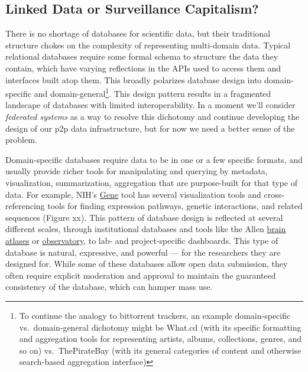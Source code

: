 \documentclass[10pt]{tufte-book}
\begin{document}
\subsection{Linked Data or Surveillance
Capitalism?}



 There is no shortage of databases for scientific data, but
their traditional structure chokes on the complexity of representing
multi-domain data. Typical relational databases require some formal
schema to structure the data they contain, which have varying
reflections in the APIs used to access them and interfaces built atop
them. This broadly polarizes database design into domain-specific and
domain-general\footnote{To continue the analogy to bittorrent trackers,
  an example domain-specific vs.~domain-general dichotomy might be
  What.cd (with its specific formatting and aggregation tools for
  representing artists, albums, collections, genres, and so on)
  vs.~ThePirateBay (with its general categories of content and otherwise
  search-based aggregation interface)}. This design pattern results in a
fragmented landscape of databases with limited interoperability. In a
moment we'll consider \emph{federated systems} as a way to resolve this
dichotomy and continue developing the design of our p2p data
infrastructure, but for now we need a better sense of the problem.

Domain-specific databases require data to be in one or a few specific
formats, and usually provide richer tools for manipulating and querying
by metadata, visualization, summarization, aggregation that are
purpose-built for that type of data. For example, NIH's
\href{https://www.ncbi.nlm.nih.gov/gene/12550}{Gene} tool has several
visualization tools and cross-referencing tools for finding expression
pathways, genetic interactions, and related sequences (Figure xx). This
pattern of database design is reflected at several different scales,
through institutional databases and tools like the Allen
\href{https://connectivity.brain-map.org/}{brain atlases} or
\href{http://observatory.brain-map.org/visualcoding/}{observatory}, to
lab- and project-specific dashboards. This type of database is natural,
expressive, and powerful --- for the researchers they are designed for.
While some of these databases allow open data submission, they often
require explicit moderation and approval to maintain the guaranteed
consistency of the database, which can hamper mass use.
\end{document}
